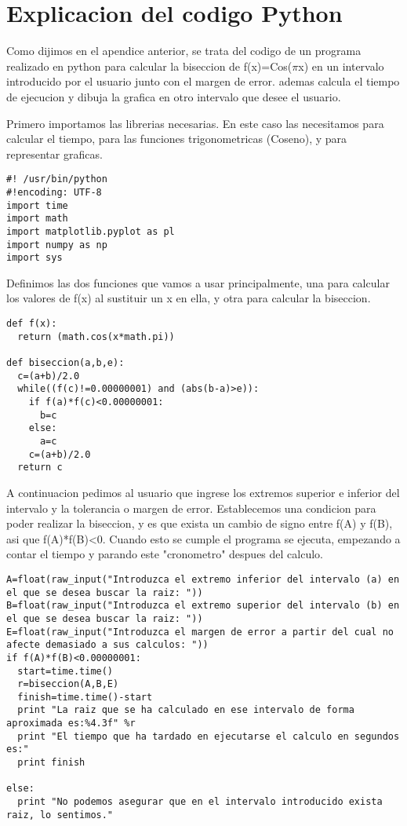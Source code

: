 \section{Explicacion del codigo \textsf{Python} }
\label{Apendice2:label}

Como dijimos en el apendice anterior, se trata del codigo de un programa realizado en python para calcular la biseccion de f(x)=Cos($\pi$x)  en un intervalo introducido por el usuario junto con el margen de error. ademas calcula el tiempo de ejecucion y dibuja la grafica en otro intervalo que desee el usuario.\par

Primero importamos las librerias necesarias. En este caso las necesitamos para calcular el tiempo, para las funciones trigonometricas (Coseno), y para representar graficas.

\begin{verbatim}
#! /usr/bin/python
#!encoding: UTF-8
import time
import math
import matplotlib.pyplot as pl
import numpy as np
import sys
\end{verbatim}

Definimos las dos funciones que vamos a usar principalmente, una para calcular los valores de f(x) al sustituir un x en ella, y otra para calcular la biseccion.

\begin{verbatim}
def f(x):
  return (math.cos(x*math.pi))
  
def biseccion(a,b,e):
  c=(a+b)/2.0
  while((f(c)!=0.00000001) and (abs(b-a)>e)):
    if f(a)*f(c)<0.00000001:
      b=c
    else:
      a=c
    c=(a+b)/2.0
  return c
\end{verbatim}

A continuacion pedimos al usuario que ingrese los extremos superior e inferior del intervalo y la tolerancia o margen de error.
Establecemos una condicion para poder realizar la biseccion, y es que exista un cambio de signo entre f(A) y f(B), asi que f(A)*f(B)<0. Cuando esto se cumple el programa se ejecuta, empezando a contar el tiempo y parando este "cronometro" despues del calculo.


\begin{verbatim}
A=float(raw_input("Introduzca el extremo inferior del intervalo (a) en el que se desea buscar la raiz: "))
B=float(raw_input("Introduzca el extremo superior del intervalo (b) en el que se desea buscar la raiz: "))
E=float(raw_input("Introduzca el margen de error a partir del cual no afecte demasiado a sus calculos: "))
if f(A)*f(B)<0.00000001:
  start=time.time()
  r=biseccion(A,B,E)
  finish=time.time()-start
  print "La raiz que se ha calculado en ese intervalo de forma aproximada es:%4.3f" %r
  print "El tiempo que ha tardado en ejecutarse el calculo en segundos es:"
  print finish
  
else:
  print "No podemos asegurar que en el intervalo introducido exista raiz, lo sentimos."
\end{verbatim}


